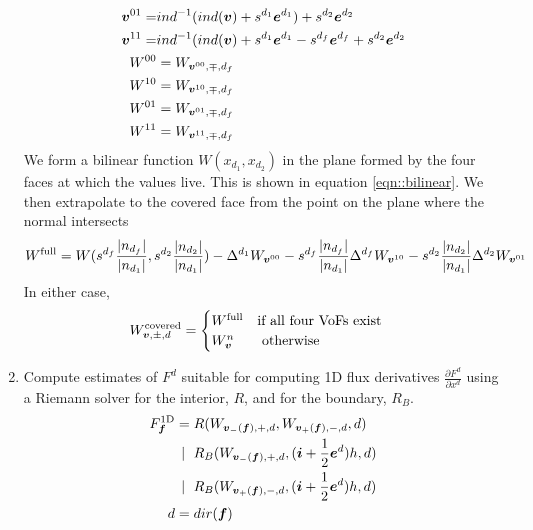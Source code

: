 \begin{enumerate}
\begin{align}
\begin{split}
{\boldsymbol{v}}^{01} =& ind^{-1}(ind({\boldsymbol{v}})+ s^{d_1} {\boldsymbol{e}}^{d_1}) + s^{d_2} {\boldsymbol{e}}^{d_2}\\
{\boldsymbol{v}}^{11} =& ind^{-1}(ind({\boldsymbol{v}})+ s^{d_1} {\boldsymbol{e}}^{d_1}
                                   - s^{d_f} {\boldsymbol{e}}^{d_f} + s^{d_2} {\boldsymbol{e}}^{d_2} \\
W^{00} &=  W_{{\boldsymbol{v}}^{00},\mp,d_f} \\ 
W^{10} &=  W_{{\boldsymbol{v}}^{10},\mp,d_f} \\
W^{01} &=  W_{{\boldsymbol{v}}^{01},\mp,d_f} \\
W^{11} &=  W_{{\boldsymbol{v}}^{11},\mp,d_f} 
\end{split}
\end{align}
We form a bilinear function $W(x_{d_1}, x_{d_2})$ in the plane formed
by the four  faces at which the values live.  This is shown in
equation \ref{eqn::bilinear}. We then extrapolate to the covered face
from the point on the plane where the normal intersects
\begin{equation}
W^{\text{full}} = W(s^{d_f} \frac{|n_{d_f}|}{|n_{d_1}|} ,s^{d_2}
\frac{|n_{d_2}|}{|n_{d_1}|}) -  \Delta^{d_1}W_{{\boldsymbol{v}}^{00}} 
- s^{d_f}\frac{|n_{d_f}|}{|n_{d_1}|} \Delta^{d_f}W_{{\boldsymbol{v}}^{10}} 
- s^{d_2}\frac{|n_{d_2}|}{|n_{d_1}|} \Delta^{d_2}W_{{\boldsymbol{v}}^{01}} 
\end{equation}
In either case,
\begin{align}
\begin{split}
W^{\text{covered}}_{{\boldsymbol{v}}, \pm, d} &=  
\begin{cases} 
 W^{\text{full}} & \text{if all four VoFs  exist} \\
W^n_{\boldsymbol{v}} & \text{ otherwise}
\end{cases} 
\end{split}
\end{align}

\item Compute estimates of $F^d$ suitable for computing 1D flux
derivatives $\frac{\partial F^d}{\partial x^d}$ using a 
Riemann solver
for the interior, $R$, and for the boundary, $R_B$.
\begin{align}
\begin{split}
F^{\text{1D}}_{\boldsymbol{f}} = 
      & \; R(  W_{{\boldsymbol{v}}_{-}({\boldsymbol{f}}), +, d}, W_{{\boldsymbol{v}}_{+}({\boldsymbol{f}}), -, d}, d) \\
~ | ~ & \; R_B(W_{{\boldsymbol{v}}_{-}({\boldsymbol{f}}), +, d}, ({\boldsymbol{i}} + \frac{1}{2} {\boldsymbol{e}}^d)h  , d) \\
~ | ~ & \; R_B(W_{{\boldsymbol{v}}_{+}({\boldsymbol{f}}), -, d}, ({\boldsymbol{i}} + \frac{1}{2} {\boldsymbol{e}}^d)h  , d) \\
d = & \; dir({\boldsymbol{f}})
\end{split}
\label{eqn::riemann1}
\end{align}


\end{enumerate}
